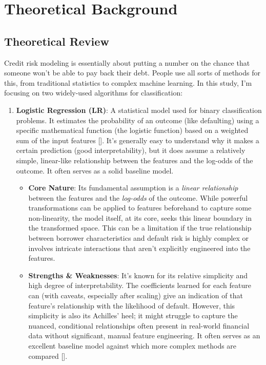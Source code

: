 \documentclass[a4paper,12pt]{article}
\begin{document}
\section{Theoretical Background}

\subsection{Theoretical Review}

Credit risk modeling is essentially about putting a number on the chance that someone won't be able to pay back their debt. People use all sorts of methods for this, from traditional statistics to complex machine learning. In this study, I'm focusing on two widely-used algorithms for classification:

\begin{enumerate}
    \item \textbf{Logistic Regression (LR)}: A statistical model used for binary classification problems. It estimates the probability of an outcome (like defaulting) using a specific mathematical function (the logistic function) based on a weighted sum of the input features [\cite{hosmer2013applied}].  It's generally easy to understand why it makes a certain prediction (good interpretability), but it does assume a relatively simple, linear-like relationship between the features and the log-odds of the outcome. It often serves as a solid baseline model.
    \begin{itemize}
        \item \textbf{Core Nature}: Its fundamental assumption is a \textit{linear relationship} between the features and the \textit{log-odds} of the outcome. While powerful transformations can be applied to features beforehand to capture some non-linearity, the model itself, at its core, seeks this linear boundary in the transformed space. This can be a limitation if the true relationship between borrower characteristics and default risk is highly complex or involves intricate interactions that aren't explicitly engineered into the features.
        \item \textbf{Strengths \& Weaknesses}: It's known for its relative simplicity and high degree of interpretability. The coefficients learned for each feature can (with caveats, especially after scaling) give an indication of that feature's relationship with the likelihood of default. However, this simplicity is also its Achilles' heel; it might struggle to capture the nuanced, conditional relationships often present in real-world financial data without significant, manual feature engineering. It often serves as an excellent baseline model against which more complex methods are compared [\cite{hosmer2013applied}].

\end{itemize}
\end{enumerate}
\end{document}
